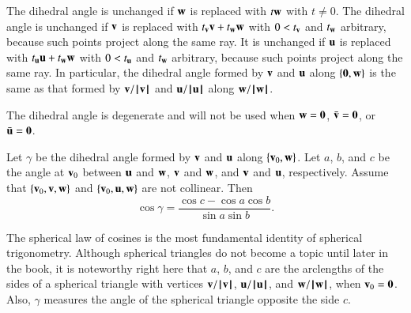 \begin{remark}\label{rem:dih}
  The dihedral angle is unchanged if $\w$ is replaced with $t \w$ with
  $t\ne0$. The dihedral angle is unchanged if $\v$ is replaced with
  $t_\v \v + t_\w \w$ with $0 < t_\v$ and $t_\w$ arbitrary, because
  such points project along the same ray.  It is unchanged if $\u$ is
  replaced with $t_\u \u + t_\w \w$ with $0 < t_\u$ and $t_\w$
  arbitrary, because such points project along the same ray.  In
  particular, the dihedral angle formed by $\v$ and $\u$ along
  $\{\orz,\w\}$ is the same as that formed by $\v/\normo{\v}$ and
  $\u/\normo{\u}$ along $\w/\normo{\w}$.
\end{remark}

The dihedral angle is degenerate and will not be used when $\w =
\orz$, $\bar \v = \orz$, or $\bar \u = \orz$.

\begin{lemma}\label{lemma:sloc}
    Let $\gamma$ be the
  dihedral angle formed by $\v$ and $\u$ along $\{\v_0,\w\}$.  Let
  $a$, $b$, and $c$ be the angle at $\v_0$ between $\u$ and $\w$, $\v$
  and $\w$, and $\v$ and $\u$, respectively. %
  Assume that $\{\v_0,\v,\w\}$ and $\{\v_0,\u,\w\}$ are not collinear.
  Then
  \begin{displaymath}\cos\gamma = \frac{\cos c - \cos a \cos b}{\sin
      a\sin b}.\end{displaymath}
\end{lemma}
%
%
%

The spherical law of cosines is the most fundamental identity of
spherical trigonometry.  Although spherical triangles do not become a
topic until later in the book, it is noteworthy right here that $a$,
$b$, and $c$ are the arclengths of the sides of a spherical triangle
with vertices $\v/\normo{\v}$, $\u/\normo{\u}$, and $\w/\normo{\w}$,
when $\v_0=\orz$.  Also, $\gamma$ measures the angle of the spherical
triangle opposite the side $c$.  %
%


